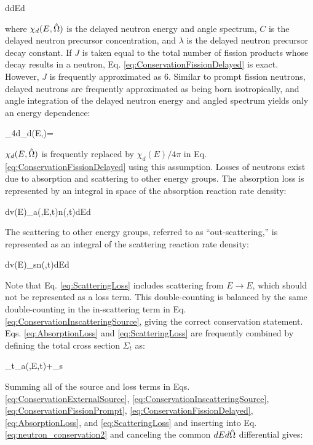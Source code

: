 \beq
\label{eq:ConservationFissionDelayed}
\left\lbrack\int d\volume \delayedfissionsource\right\rbrack dEd\hO  
\eeq

where \(\chi_d(E,\hat{\Omega})\) is the delayed neutron energy and angle spectrum, \(C\) is the delayed neutron precursor concentration, and \(\lambda\) is the delayed neutron precursor decay constant. If \(J\) is taken equal to the total number of fission products whose decay results in a neutron, Eq. \eqref{eq:ConservationFissionDelayed} is exact. However, \(J\) is frequently approximated as 6. Similar to prompt fission neutrons, delayed neutrons are frequently approximated as being born isotropically, and angle integration of the delayed neutron energy and angled spectrum yields only an energy dependence:

\beq
\label{eq:delayed_isotropic}
\int_{4\pi}d\hO \chi_d(E,\hO)=
\eeq

\(\chi_d(E,\hat{\Omega})\) is frequently replaced by \(\chi_d(E)/4\pi\) in Eq. \eqref{eq:ConservationFissionDelayed} using this assumption. Losses of neutrons exist due to absorption and scattering to other energy groups. The absorption loss is represented by an integral in space of the absorption reaction rate density:

\beq
\label{eq:AbsorptionLoss}
\left\lbrack\int d\volume v(E)\Sigma_a(,E,t)n(,t)\right\rbrack dEd\hO
\eeq

The scattering to other energy groups, referred to as ``out-scattering,'' is represented as an integral of the scattering reaction rate density:

\beq
\label{eq:ScatteringLoss}
\left\lbrack\int d\volume v(E)\Sigma_s\seatout n(,t)\right\rbrack dEd\hO
\eeq

Note that Eq. \eqref{eq:ScatteringLoss} includes scattering from \(E\rightarrow E\), which should not be represented as a loss term. This double-counting is balanced by the same double-counting in the in-scattering term in Eq. \eqref{eq:ConservationInscatteringSource}, giving the correct conservation statement. Eqs. \eqref{eq:AbsorptionLoss} and \eqref{eq:ScatteringLoss} are frequently combined by defining the total cross section \(\Sigma_t\) as:

\beq
\label{eq:TotalSigmaDef}
\Sigma_t\seatout\equiv\Sigma_a(,E,t)+\Sigma_s\seatout
\eeq

Summing all of the source and loss terms in Eqs. \eqref{eq:ConservationExternalSource}, \eqref{eq:ConservationInscatteringSource}, \eqref{eq:ConservationFissionPrompt}, \eqref{eq:ConservationFissionDelayed}, \eqref{eq:AbsorptionLoss}, and \eqref{eq:ScatteringLoss} and inserting into Eq. \eqref{eq:neutron_conservation2} and canceling the common \(dEd\hat{\Omega}\) differential gives:

